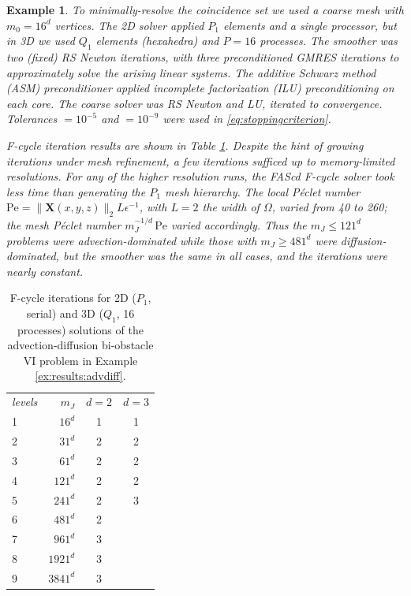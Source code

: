 \documentclass[letterpaper,final,12pt,reqno]{amsart}
\theoremstyle{cstyle}
\theoremstyle{cstyle*}
\theoremstyle{dstyle}
\newtheorem{example}[theorem]{Example}
\numberwithin{equation}{section}
\numberwithin{figure}{section}
\numberwithin{table}{section}
\numberwithin{theorem}{section}
\newcommand{\eps}{\epsilon}
\newcommand{\bX}{\mathbf{X}}
\begin{document}
\begin{example}
To minimally-resolve the coincidence set we used a coarse mesh with $m_0=16^d$ vertices.  The 2D solver applied $P_1$ elements and a single processor, but in 3D we used $Q_1$ elements (hexahedra) and $P=16$ processes.  The smoother was two (fixed) RS Newton iterations,  with three preconditioned GMRES iterations to approximately solve the arising linear systems.  The additive Schwarz method (ASM) preconditioner applied incomplete factorization (ILU) preconditioning on each core.  The coarse solver was RS Newton and LU, iterated to convergence.  Tolerances  $=10^{-5}$ and  $=10^{-9}$ were used in \eqref{eq:stoppingcriterion}.

F-cycle iteration results are shown in Table \ref{tab:results:advdiff}.  Despite the hint of growing iterations under mesh refinement, a few iterations sufficed up to memory-limited resolutions.  For any of the higher resolution runs, the FAScd F-cycle solver took less time than generating the $P_1$ mesh hierarchy.  The local Péclet number $\text{Pe}=\|\bX(x,y,z)\|_2 L \eps^{-1}$, with $L=2$ the width of $\Omega$, varied from 40 to 260; the mesh Péclet number $m_J^{-1/d}\,\text{Pe}$ varied accordingly.  Thus the $m_J\le 121^d$ problems were advection-dominated while those with $m_J\ge 481^d$ were diffusion-dominated, but the smoother was the same in all cases, and the iterations were nearly constant.
\end{example}

\begin{table}[ht]
\begin{tabular}{lr@{\hskip 7mm}c@{\hskip 4mm}c}
\emph{levels} & $m_J$ & $d=2$ & $d=3$ \\ \cmidrule{1-4}
 1 &    $16^d$ & 1 & 1 \\
 2 &    $31^d$ & 2 & 2 \\
 3 &    $61^d$ & 2 & 2 \\
 4 &   $121^d$ & 2 & 2 \\
 5 &   $241^d$ & 2 & 3 \\
 6 &   $481^d$ & 2 \\
 7 &   $961^d$ & 3 \\
 8 &  $1921^d$ & 3 \\
 9 &  $3841^d$ & 3
\end{tabular}
\bigskip
\caption{F-cycle iterations for 2D ($P_1$, serial) and 3D ($Q_1$, 16 processes) solutions of the advection-diffusion bi-obstacle VI problem in Example \ref{ex:results:advdiff}.}
\label{tab:results:advdiff}
\end{table}
\end{document}
